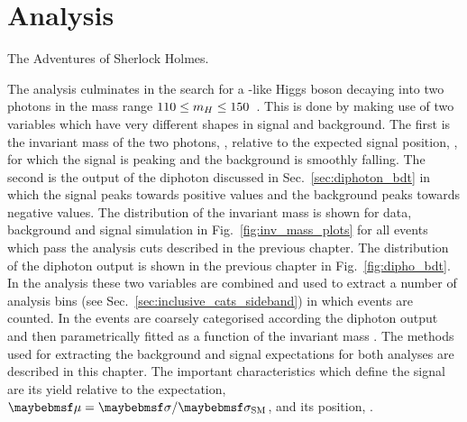 \chapter{Analysis}
\label{chap:analysis}
{The Adventures of Sherlock Holmes.}

The analysis culminates in the search for a \SM-like Higgs boson decaying into two photons in the mass range $110\leq m_{H}\leq 150$~\GeV. This is done by making use of two variables which have very different shapes in signal and background. The first is the invariant mass of the two photons, \mgg, relative to the expected signal position, \mH, for which the signal is peaking and the background is smoothly falling. The second is the output of the diphoton \BDT discussed in Sec.~\ref{sec:diphoton_bdt} in which the signal peaks towards positive values and the background peaks towards negative values. The distribution of the invariant mass is shown for data, background and signal \MC simulation in Fig.~\ref{fig:inv_mass_plots} for all events which pass the analysis cuts described in the previous chapter. The distribution of the diphoton \BDT output is shown in the previous chapter in Fig.~\ref{fig:dipho_bdt}. In the \SMVA analysis these two variables are combined and used to extract a number of analysis bins (see Sec.~\ref{sec:inclusive_cats_sideband}) in which events are counted. In the \MFM events are coarsely categorised according the diphoton \BDT output and then parametrically fitted as a function of the invariant mass \mgg. The methods used for extracting the background and signal expectations for both analyses are described in this chapter. The important characteristics which define the signal are its yield relative to the \SM expectation, $\mu=\musm$, and its position, \mH.

